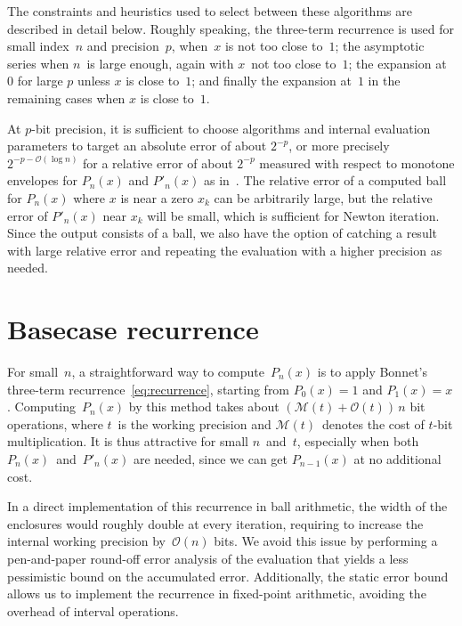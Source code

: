 \documentclass{siamart0216}
\newcommand{\OO}{\mathcal{O}}
\newcommand{\MM}{\mathcal{M}}
\begin{document}
The constraints and heuristics used to select between these algorithms
are described in detail below.
Roughly speaking,
the three-term recurrence is used for small index~$n$ and precision~$p$, when~$x$
is not too close to~$1$;
the asymptotic series when $n$~is large enough, again with $x$~not too
close to~$1$;
the expansion at~$0$ for large $p$ unless $x$ is close to~$1$;
and finally the expansion at~$1$ in the remaining cases
when $x$ is close to~$1$.

At $p$-bit precision, it is sufficient to choose algorithms
and internal evaluation parameters to target
an absolute error of about $2^{-p}$, or more precisely $2^{-p-\OO(\log n)}$
for a relative error of about $2^{-p}$ measured with respect
to monotone envelopes for $P_n(x)$ and $P'_n(x)$ as in~\cite{Bogaert2012}.
The relative error of a computed ball for $P_n(x)$ where $x$ is near a zero $x_k$
can be arbitrarily large, but the relative error of $P'_n(x)$ near $x_k$
will be small, which is sufficient for Newton iteration.
Since the output consists of a ball, we also have the option of catching
a result with large relative error and repeating the evaluation with a
higher precision as needed.

\section{Basecase recurrence}

\label{sec:recurrence}

For small $n$, a straightforward way to compute~$P_n(x)$ is to apply
Bonnet's three-term recurrence \eqref{eq:recurrence},
starting from $P_0(x)=1$ and $P_1(x) = x$.
Computing~$P_n(x)$ by this method takes about $(\MM(t) + \OO(t))\, n$
bit operations, where $t$ is the working precision and $\MM(t)$ denotes the
cost of $t$-bit multiplication.
It is thus attractive for small $n$ and $t$, especially when both
$P_n(x)$ and $P'_n(x)$ are needed, since we can get $P_{n-1}(x)$ at no
additional cost.

In a direct implementation of this recurrence in ball arithmetic, the
width of the enclosures would roughly double at every iteration,
requiring to increase the internal working precision by $\OO(n)$ bits.
We avoid this issue by performing a pen-and-paper round-off error
analysis of the evaluation that yields a less pessimistic bound on the
accumulated error.
Additionally, the static error bound allows us to implement the
recurrence in fixed-point arithmetic, avoiding the overhead of
interval operations.
\end{document}
